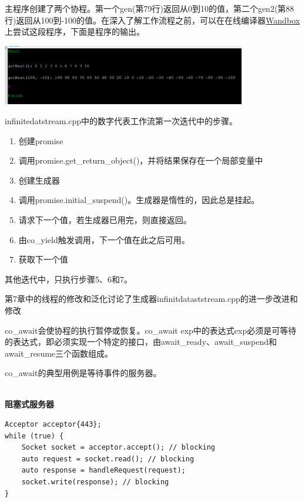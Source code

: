 主程序创建了两个协程。第一个gen(第79行)返回从0到10的值，第二个gen2(第88行)返回从100到-100的值。在深入了解工作流程之前，可以在在线编译器\href{https://wandbox.org/}{Wandbox}上尝试这段程序，下面是程序的输出。

\begin{center}
\includegraphics[width=0.8\textwidth]{content/3/chapter6/images/5.png}\\
\end{center}

infinitedatstream.cpp中的数字代表工作流第一次迭代中的步骤。

\begin{enumerate}
\item 
创建promise

\item 
调用promise.get\_return\_object()，并将结果保存在一个局部变量中

\item 
创建生成器

\item 
调用promise.initial\_suspend()。生成器是惰性的，因此总是挂起。

\item 
请求下一个值，若生成器已用完，则直接返回。

\item 
由co\_yield触发调用，下一个值在此之后可用。

\item 
获取下一个值
\end{enumerate}

其他迭代中，只执行步骤5、6和7。

第7章中的线程的修改和泛化讨论了生成器infinitdataststream.cpp的进一步改进和修改


co\_await会使协程的执行暂停或恢复。co\_await exp中的表达式exp必须是可等待的表达式，即必须实现一个特定的接口，由await\_ready、await\_suspend和await\_resume三个函数组成。

co\_await的典型用例是等待事件的服务器。

\hspace*{\fill} \\ %
\noindent
\textbf{阻塞式服务器}
\begin{lstlisting}[style=styleCXX]
Acceptor acceptor{443};
while (true) {
	Socket socket = acceptor.accept(); // blocking
	auto request = socket.read(); // blocking
	auto response = handleRequest(request);
	socket.write(response); // blocking
}
\end{lstlisting}

